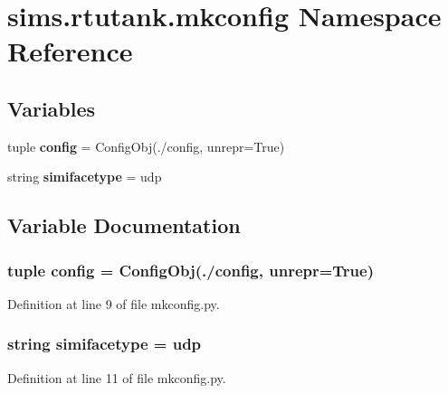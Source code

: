\section{sims.\+rtutank.\+mkconfig Namespace Reference}
\label{namespacesims_1_1rtutank_1_1mkconfig}
\subsection*{Variables}
\begin{DoxyCompactItemize}
\item 
tuple {\bf config} = Config\+Obj(\textquotesingle{}./config\textquotesingle{}, unrepr=True)
\item 
string {\bf simifacetype} = \textquotesingle{}udp\textquotesingle{}
\end{DoxyCompactItemize}


\subsection{Variable Documentation}
\subsubsection[{config}]{\setlength{\rightskip}{0pt plus 5cm}tuple config = Config\+Obj(\textquotesingle{}./config\textquotesingle{}, unrepr=True)}\label{namespacesims_1_1rtutank_1_1mkconfig_ad5f91786d7c873886a576621a2c1b0b5}


Definition at line 9 of file mkconfig.\+py.

\subsubsection[{simifacetype}]{\setlength{\rightskip}{0pt plus 5cm}string simifacetype = \textquotesingle{}udp\textquotesingle{}}\label{namespacesims_1_1rtutank_1_1mkconfig_a7f5f5e89422cd15dfc1af6d7593d69c7}


Definition at line 11 of file mkconfig.\+py.

